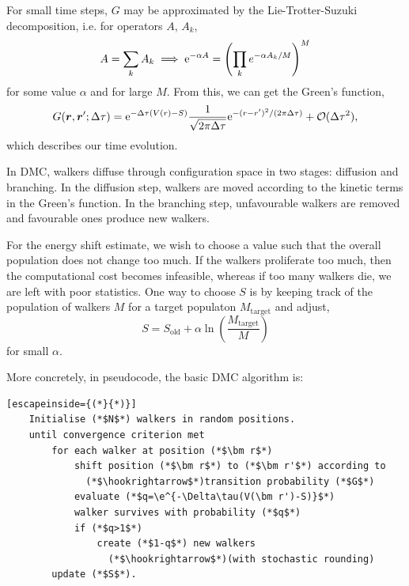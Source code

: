 For small time steps, $G$ may be approximated by the Lie-Trotter-Suzuki decomposition, i.e. for operators $A$, $A_k$,
\begin{equation}
    A = \sum_kA_k \implies \mathrm{e}^{-\alpha A} = \left( \prod_k e^{-\alpha A_k/M} \right)^M
\end{equation}
for some value $\alpha$ and for large $M$. From this, we can get the Green's function,
\begin{equation}
    G(\bm r, \bm r'; \Delta\tau) = \mathrm{e}^{-\Delta\tau(V(r)-S)}\frac{1}{\sqrt{2\pi\Delta\tau}}\mathrm{e}^{-(r - r')^2/(2\pi\Delta\tau)}+\mathcal{O}(\Delta\tau^2),
\end{equation}
which describes our time evolution.

In \gls{DMC}, walkers diffuse through configuration space in two stages: diffusion and branching. In the diffusion step, walkers are moved according to the kinetic terms in the Green's function. In the branching step, unfavourable walkers are removed and favourable ones produce new walkers.

For the energy shift estimate, we wish to choose a value such that the overall population does not change too much. If the walkers proliferate too much, then the computational cost becomes infeasible, whereas if too many walkers die, we are left with poor statistics. One way to choose $S$ is by keeping track of the population of walkers $M$ for a target populaton $M_\mathrm{target}$ and adjust,
\begin{equation}
    S = S_\mathrm{old} + \alpha\ln\left(\frac{M_\mathrm{target}}{M}\right)
\end{equation}
for small $\alpha$.

More concretely, in pseudocode, the basic \gls{DMC} algorithm is:

\begin{minipage}{\textwidth}
\begin{lstlisting}[escapeinside={(*}{*)}]
    Initialise (*$N$*) walkers in random positions.
    until convergence criterion met
        for each walker at position (*$\bm r$*)
            shift position (*$\bm r$*) to (*$\bm r'$*) according to
              (*$\hookrightarrow$*)transition probability (*$G$*)
            evaluate (*$q=\e^{-\Delta\tau(V(\bm r')-S)}$*)
            walker survives with probability (*$q$*)
            if (*$q>1$*)
                create (*$1-q$*) new walkers
                  (*$\hookrightarrow$*)(with stochastic rounding)
        update (*$S$*).
\end{lstlisting}
\end{minipage}

